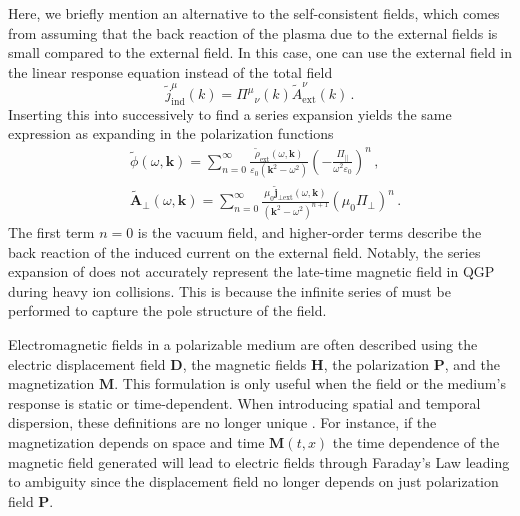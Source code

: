 Here, we briefly mention an alternative to the self-consistent fields, which comes from assuming that the back reaction of the plasma due to the external fields is small compared to the external field. In this case, one can use the external field in the linear response equation instead of the total field
\begin{equation}\label{eq:pert}
    \widetilde{j}_{\mathrm{ind}}^{\mu}(k) = {\Pi^{\mu}}_{\nu}(k) \widetilde{A}_\text{ext}^{\nu}(k)\,.
\end{equation}
Inserting this into  successively to find a series expansion yields the same expression as expanding  in the polarization functions
\begin{align}\label{eq:phipert}
&\widetilde{\phi}(\omega,\boldsymbol{k}) = \sum_{n=0}^\infty\frac{\widetilde{\rho}_\text{ext}(\omega,\boldsymbol{k})}{\varepsilon_0(\boldsymbol{k}^2-\omega^2)}\left(-\frac{\Pi_{\parallel}}{ \omega^2\varepsilon_0}\right)^n\,, \\\label{eq:aperppert}
&\widetilde{\boldsymbol{A}}_\perp(\omega,\boldsymbol{k}) = \sum_{n=0}^\infty\frac{\mu_0 \widetilde{\boldsymbol{j}}_{\perp \text{ext}}(\omega,\boldsymbol{k})}{(\boldsymbol{k}^2 - \omega^2)^{n+1}}(\mu_0 \Pi_{\perp})^{n}\,.
\end{align}
The first term $n=0$ is the vacuum field, and higher-order terms describe the back reaction of the induced current on the external field. Notably, the series expansion of  does not accurately represent the late-time magnetic field in QGP during heavy ion collisions. This is because the infinite series of  must be performed to capture the pole structure of the field. 

Electromagnetic fields in a polarizable medium are often described using the electric displacement field $\mathbf{D}$, the magnetic fields $\mathbf{H}$, the polarization $\mathbf{P}$, and the magnetization $\mathbf{M}$. This formulation is only useful when the field or the medium's response is static or time-dependent. When introducing spatial and temporal dispersion, these definitions are no longer unique \cite{melrose2008quantum}. For instance, if the magnetization depends on space and time $\mathbf{M}(t,x)$ the time dependence of the magnetic field generated will lead to electric fields through Faraday's Law leading to ambiguity since the displacement field no longer depends on just polarization field $\mathbf{P}$.


